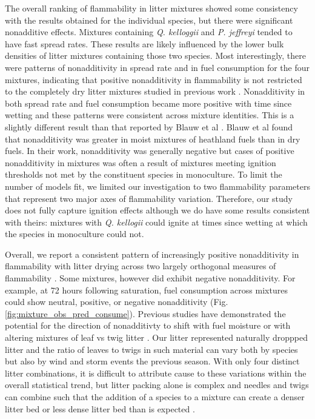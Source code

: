 \documentclass[letterpaper,12pt]{article}
\begin{document}
The overall ranking of flammability in litter mixtures showed some consistency
with the results obtained for the individual species, but there were
significant nonadditive effects. Mixtures containing \emph{Q. kelloggii} and
\emph{P. jeffreyi} tended to have fast spread rates. These results are likely
influenced by the lower bulk densities of litter mixtures containing those two
species. Most interestingly, there were patterns of nonadditivity in spread
rate and in fuel consumption for the four mixtures, indicating that positive
nonadditivity in flammability is not restricted to the completely dry litter
mixtures studied in previous work \citep{Magalhaes+Schwilk-2012,
  VanAltena+Logtestjin+etal-2012}. Nonadditivity in both spread rate and fuel
consumption became more positive with time since wetting and these patterns
were consistent across mixture identities. This is a slightly different result
than that reported by Blauw et al \citeyear{Blauw+Wensink+etal-2015}. Blauw et
al found that nonadditivity was greater in moist mixtures of heathland fuels
than in dry fuels. In their work, nonadditivity was generally negative but
cases of positive nonadditivity in mixtures was often a result of mixtures
meeting ignition thresholds not met by the constituent species in monoculture. To limit the number of models fit, we limited our investigation
to two flammability parameters that represent two major axes of flammability
variation. Therefore, our study does not fully capture ignition effects
although we do have some results consistent with theirs: mixtures with \emph{Q.
  kellogii} could ignite at times since wetting at which the species in
monoculture could not.

Overall, we report a consistent pattern of increasingly positive nonadditivity
in flammability with litter drying across two largely orthogonal measures of
flammability \citep{Schwilk-2015, Pausas+Keeley+etal-2017,
  Prior+Murphy+etal-2018}. Some mixtures, however did exhibit negative nonadditivity. For example, at 72 hours following saturation, fuel consumption across mixtures could show neutral, positive, or negative nonadditivity (Fig. \ref{fig:mixture_obs_pred_consume}). Previous studies have demonstrated the potential for the direction of nonadditivty to shift with fuel moisture \citep{Blauw+Wensink+etal-2015} or with altering mixtures of leaf vs twig litter \citep{Zhao+vanLogtestijn+etal-2019}. Our litter represented naturally droppped litter and the ratio of leaves to twigs in such material can vary both by species but also by wind and storm events the previous season. With only four distinct litter combinations, it is difficult to attribute cause to these variations within the overall statistical trend, but litter packing alone is complex and needles and twigs can combine such that the addition of a species to a mixture can create a denser litter bed or less dense litter bed than is expected \citep{Zhao+vanLogtestijn+etal-2019}.
\end{document}
